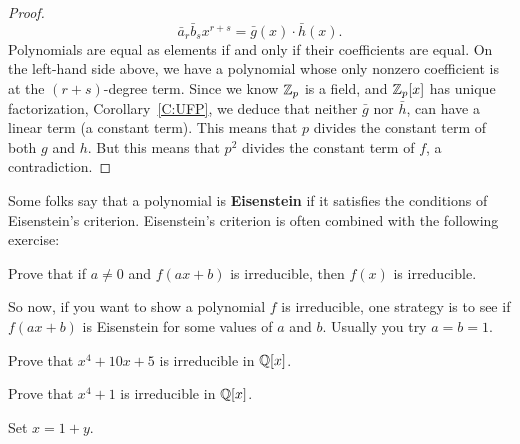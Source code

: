 \documentclass{ximera}
\begin{document}
\begin{theorem}
\begin{proof}
    \[
    \bar{a}_r\bar{b}_sx^{r+s}=  \bar{g}(x)\cdot \bar{h}(x).
    \]
    Polynomials are equal as elements if and only if their
    coefficients are equal. On the left-hand side above, we have a
    polynomial whose only nonzero coefficient is at the $(r+s)$-degree
    term. Since we know $\mathbb Z_p$ is a field, and $\mathbb Z_p[x]$ has unique
    factorization, Corollary~\ref{C:UFP}, we deduce that neither
    $\bar{g}$ nor $\bar{h}$, can have a linear term (a constant
    term). This means that $p$ divides the constant term of both $g$
    and $h$. But this means that $p^2$ divides the constant term of
    $f$, a contradiction.
  \end{proof}
\end{theorem}

Some folks say that a polynomial is \textbf{Eisenstein} if it
satisfies the conditions of Eisenstein's criterion. Eisenstein's
criterion is often combined with the following exercise:
\begin{exercise}\label{E:et}
  Prove that if $a\ne 0$ and $f(ax+b)$ is irreducible, then $f(x)$ is
  irreducible.
\end{exercise}
So now, if you want to show a polynomial $f$ is irreducible, one
strategy is to see if $f(ax+b)$ is Eisenstein for some values of $a$
and $b$. Usually you try $a=b=1$.


\begin{exercise}
  Prove that $x^4 + 10x + 5$ is irreducible in $\mathbb Q[x]$.
\end{exercise}



\begin{exercise}
  Prove that $x^4 + 1$ is irreducible in $\mathbb Q[x]$.
  \begin{hint}
    Set $x = 1+y$.
  \end{hint}
\end{exercise}
\end{document}
